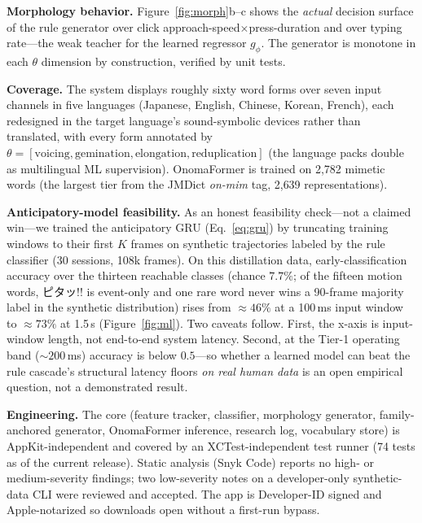 \documentclass[sigconf,nonacm]{acmart}
\newcommand{\jp}[1]{#1}
\begin{document}
\textbf{Morphology behavior.} Figure~\ref{fig:morph}b--c shows the \emph{actual} decision surface of the rule generator over click approach-speed$\times$press-duration and over typing rate---the weak teacher for the learned regressor $g_\phi$. The generator is monotone in each $\theta$ dimension by construction, verified by unit tests.

\textbf{Coverage.} The system displays roughly sixty word forms over seven input channels in five languages (Japanese, English, Chinese, Korean, French), each redesigned in the target language's sound-symbolic devices rather than translated, with every form annotated by $\theta=[\text{voicing},\text{gemination},\text{elongation},\text{reduplication}]$ (the language packs double as multilingual ML supervision). OnomaFormer is trained on 2{,}782 mimetic words (the largest tier from the JMDict \emph{on-mim} tag, 2{,}639 representations).

\textbf{Anticipatory-model feasibility.} As an honest feasibility check---not a claimed win---we trained the anticipatory GRU (Eq.~\ref{eq:gru}) by truncating training windows to their first $K$ frames on synthetic trajectories labeled by the rule classifier (30 sessions, 108k frames). On this distillation data, early-classification accuracy over the thirteen reachable classes (chance $7.7\%$; of the fifteen motion words, \jp{ピタッ!!} is event-only and one rare word never wins a 90-frame majority label in the synthetic distribution) rises from ${\approx}46\%$ at a 100\,ms input window to ${\approx}73\%$ at 1.5\,s (Figure~\ref{fig:ml}). Two caveats follow. First, the x-axis is input-window length, not end-to-end system latency. Second, at the Tier-1 operating band (${\sim}200$\,ms) accuracy is below $0.5$---so whether a learned model can beat the rule cascade's structural latency floors \emph{on real human data} is an open empirical question, not a demonstrated result.

\textbf{Engineering.} The core (feature tracker, classifier, morphology generator, family-anchored generator, OnomaFormer inference, research log, vocabulary store) is AppKit-independent and covered by an XCTest-independent test runner (74 tests as of the current release). Static analysis (Snyk Code) reports no high- or medium-severity findings; two low-severity notes on a developer-only synthetic-data CLI were reviewed and accepted. The app is Developer-ID signed and Apple-notarized so downloads open without a first-run bypass.
\end{document}
